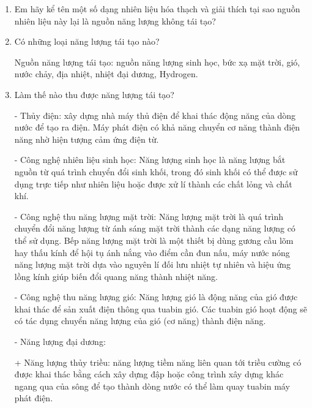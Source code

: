 
\setcounter{section}{0}

\begin{enumerate}[label=\bfseries Câu \arabic*:]
	\item {}
	
	{
		Em hãy kể tên một số dạng nhiên liệu hóa thạch và giải thích tại sao nguồn nhiên liệu này lại là nguồn năng lượng không tái tạo?
	}
	
	
	\item {}
	
	
	{
		Có những loại năng lượng tái tạo nào?
	}
	
	\hideall
	{
		Nguồn năng lượng tái tạo: nguồn năng lượng sinh học, bức xạ mặt trời, gió, nước chảy, địa nhiệt, nhiệt đại dương, Hydrogen.
		
	}
	\item {}
	
	
	{
		Làm thế nào thu được năng lượng tái tạo?
	}
	
	\hideall
	{
		- Thủy điện: xây dựng nhà máy thủ điện để khai thác động năng của dòng nước để tạo ra điện. Máy phát điện có khả năng chuyển cơ năng thành điện năng nhờ hiện tượng cảm ứng điện từ.
		
		- Công nghệ nhiên liệu sinh học: Năng lượng sinh học là năng lượng bắt nguồn từ quá trình chuyển đổi sinh khối, trong đó sinh khối có thể được sử dụng trực tiếp như nhiên liệu hoặc được xử lí thành các chất lỏng và chất khí.
		
		- Công nghệ thu năng lượng mặt trời: Năng lượng mặt trời là quá trình chuyển đổi năng lượng từ ánh sáng mặt trời thành các dạng năng lượng có thể sử dụng. Bếp năng lượng mặt trời là một thiết bị dùng gương cầu lõm hay thấu kính để hội tụ ánh nắng vào điểm cần đun nấu, máy nước nóng năng lượng mặt trời dựa vào nguyên lí đối lưu nhiệt tự nhiên và hiệu ứng lồng kính giúp biến đổi quang năng thành nhiệt năng.
		
		- Công nghệ thu năng lượng gió: Năng lượng gió là động năng của gió được khai thác để sản xuất điện thông qua tuabin gió. Các tuabin gió hoạt động sẽ có tác dụng chuyển năng lượng của gió (cơ năng) thành điện năng.
		
		- Năng lượng đại dương: 
		
		+ Năng lượng thủy triều: năng lượng tiềm năng liên quan tới triều cường có được khai thác bằng cách xây dựng đập hoặc công trình xây dựng khác ngang qua của sông để tạo thành dòng nước có thể làm quay tuabin máy phát điện. 
		
}
\end{enumerate}
